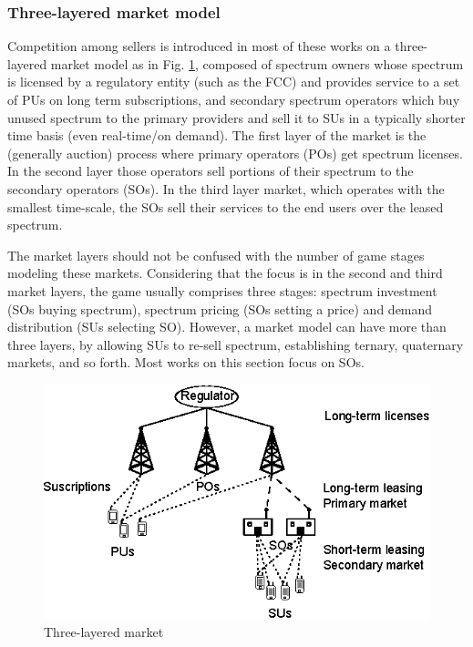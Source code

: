 \subsubsection{Three-layered market model}
Competition among sellers is introduced in most of these works on a three-layered market model as in Fig. \ref{fig:LayeredMarket}, composed of spectrum owners whose spectrum is licensed by a regulatory entity (such as the FCC) and provides service to a set of PUs on long term subscriptions, and secondary spectrum operators which buy unused spectrum to the primary providers and sell it to SUs in a typically shorter time basis (even real-time/on demand). The first layer of the market is the (generally auction) process where primary operators (POs) get spectrum licenses. 
In the second layer those operators sell portions of their spectrum to the secondary operators (SOs).
In the third layer market, which operates with the smallest time-scale, the SOs sell their services to the end users over the leased spectrum. 

The market layers should not be confused with the number of game stages modeling these markets. Considering that the focus is in the second and third market layers, the game usually comprises three stages: spectrum investment (SOs buying spectrum), spectrum pricing (SOs setting a price) and demand distribution (SUs selecting SO). However, a market model can have more than three layers, by allowing SUs to re-sell spectrum, establishing ternary, quaternary markets, and so forth. Most works on this section focus on SOs.

\begin{figure}[!ht]
  \begin{center}
  \includegraphics[scale=1]{Fig5.eps}
  \end{center}
  \caption{Three-layered market}
   \label{fig:LayeredMarket}
\end{figure}

